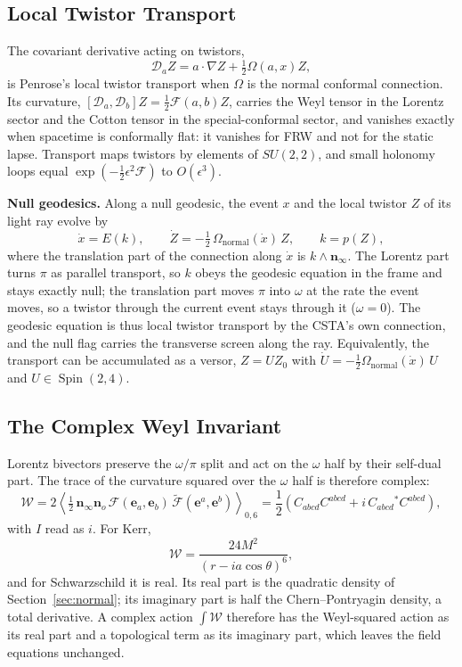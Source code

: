\documentclass[11pt,a4paper]{article}
\newcommand{\Spin}{\operatorname{Spin}}
\newcommand{\D}{\mathcal{D}}
\newcommand{\F}{\mathcal{F}}
\newcommand{\W}{\mathcal{W}}
\newcommand{\Om}{\Omega}
\newcommand{\nzero}{\mathbf{n}_o}
\newcommand{\ninf}{\mathbf{n}_\infty}
\newcommand{\e}{\mathbf{e}}
\newcommand{\wedgeprod}{\mathbin{\wedge}}
\newcommand{\rev}[1]{\widetilde{#1}}
\begin{document}
\subsection{Local Twistor Transport}

The covariant derivative acting on twistors,
\[
    \D_aZ=a\cdot\nabla Z+\tfrac12\Om(a,x)Z,
\]
is Penrose's local twistor transport when \(\Om\) is the normal
conformal connection. Its curvature,
\([\D_a,\D_b]Z=\tfrac12\F(a,b)Z\), carries the Weyl tensor in the
Lorentz sector and the Cotton tensor in the special-conformal sector,
and vanishes exactly when spacetime is conformally flat: it vanishes
for FRW and not for the static lapse. Transport maps twistors
by elements of \(SU(2,2)\), and small holonomy loops equal
\(\exp(-\tfrac12\epsilon^2\F)\) to \(O(\epsilon^3)\).

\textbf{Null geodesics.} Along a null geodesic, the event \(x\) and
the local twistor \(Z\) of its light ray evolve by
\[
    \dot x=E(k),
    \qquad
    \dot Z=-\tfrac12\,\Om_{\mathrm{normal}}(\dot x)\,Z,
    \qquad
    k=p(Z),
\]
where the translation part of the connection along \(\dot x\) is
\(k\wedgeprod\ninf\). The Lorentz part turns \(\pi\) as parallel
transport, so \(k\) obeys the geodesic equation in the frame and stays
exactly null; the translation part moves \(\pi\) into \(\omega\) at
the rate the event moves, so a twistor through the current event
stays through it (\(\omega=0\)). The geodesic equation is thus local
twistor transport by the CSTA's own connection, and the null flag
carries the transverse screen along the ray. Equivalently, the
transport can be accumulated as a versor, \(Z=UZ_0\) with
\(\dot U=-\tfrac12\Om_{\mathrm{normal}}(\dot x)\,U\) and
\(U\in\Spin(2,4)\).

\subsection{The Complex Weyl Invariant}

Lorentz bivectors preserve the \(\omega/\pi\) split and act on the
\(\omega\) half by their self-dual part. The trace of the curvature
squared over the \(\omega\) half is therefore complex:
\[
\boxed{
    \W=
    2\left\langle\tfrac12\,\ninf\nzero\,
    \F(\e_a,\e_b)\,\rev{\F}(\e^a,\e^b)
    \right\rangle_{0,6}
    =
    \frac12\left(C_{abcd}C^{abcd}+i\,C_{abcd}{}^{*}C^{abcd}\right),
}
\]
with \(I\) read as \(i\). For Kerr,
\[
    \W=\frac{24M^2}{(r-ia\cos\theta)^6},
\]
and for Schwarzschild it is real. Its real part is the quadratic
density of Section~\ref{sec:normal}; its imaginary part is half the
Chern--Pontryagin density, a total derivative. A complex action
\(\int\W\) therefore has the Weyl-squared action as its real part and
a topological term as its imaginary part, which leaves the field
equations unchanged.
\end{document}
